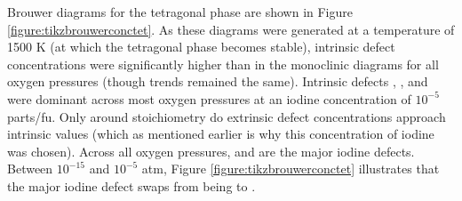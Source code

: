 Brouwer diagrams for the tetragonal phase are shown in Figure \ref{figure:tikzbrouwerconctet}. As these diagrams were generated at a temperature of 1500 K (at which the tetragonal phase becomes stable), intrinsic defect concentrations were significantly higher than in the monoclinic diagrams for all oxygen pressures (though trends remained the same). Intrinsic defects , ,  and  were dominant across most oxygen pressures at an iodine concentration of $10^{-5}$ parts/fu. Only around stoichiometry do extrinsic defect concentrations approach intrinsic values (which as mentioned earlier is why this concentration of iodine was chosen). Across all oxygen pressures,  and  are the major iodine defects. Between $10^{-15}$ and $10^{-5}$ atm, Figure \ref{figure:tikzbrouwerconctet} illustrates that the major iodine defect swaps from being  to . 

